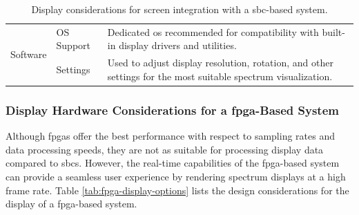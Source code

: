 \documentclass[class=report,11pt,crop=false]{standalone}
\begin{document}
\begin{table}[ht!]
\begin{tabular}{|m{5em}|m{10em}|m{24em}|}
			\multirow{2}{*}{Software} 
			& OS Support & Dedicated \acrshort{os} recommended for compatibility with built-in display drivers and utilities. \\
			\cline{2-3}
			& Settings & Used to adjust display resolution, rotation, and other settings for the most suitable spectrum visualization. \\
			\hline
		\end{tabular}
		\caption{Display considerations for screen integration with a \acrshort{sbc}-based system.}
		\label{tab:sbc-display-options}
	\end{table}
	
	\subsubsection{Display Hardware Considerations for a \acrshort{fpga}-Based System}
	
	Although \acrshort{fpga}s offer the best performance with respect to sampling rates and data processing speeds, they are not as suitable for processing display data compared to \acrshort{sbc}s. However, the real-time capabilities of the \acrshort{fpga}-based system can provide a seamless user experience by rendering spectrum displays at a high frame rate. Table \ref{tab:fpga-display-options} lists the design considerations for the display of a \acrshort{fpga}-based system.
	
\end{document}
